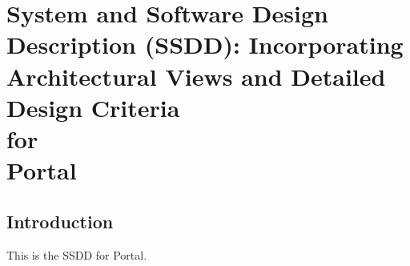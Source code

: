 \documentclass[12pt, oneside, letterpaper]{report}
\begin{document}
\part{System and Software Design Description (SSDD): Incorporating
     Architectural Views and Detailed Design Criteria \\ for \\ Portal}
\tableofcontents                                %
\listoffigures
\listoftables
\chapter{Introduction}
This is the SSDD for Portal.
\end{document}

